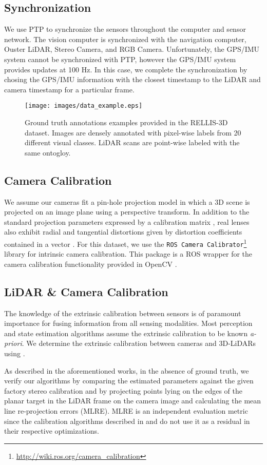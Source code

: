 \documentclass[letterpaper, 10 pt, conference]{ieeeconf}
\begin{document}
\subsection{Synchronization}
We use PTP to synchronize the sensors throughout the computer and sensor network. The vision computer is synchronized with the navigation computer, Ouster LiDAR, Stereo Camera, and RGB Camera. Unfortunately, the GPS/IMU system cannot be synchronized with PTP, however the GPS/IMU system provides updates at 100 Hz. In this case, we complete the synchronization by chosing the GPS/IMU information with the closest timestamp to the LiDAR and camera timestamp for a particular frame.
\begin{figure*}
\vspace{5pt}
  \centering
  \texttt{[image: images/data\_example.eps]}
  \caption{Ground truth annotations examples provided in the RELLIS-3D dataset. Images are densely annotated with pixel-wise labels from 20 different visual classes. LiDAR scans are point-wise labeled with the same ontogloy.}
  \label{fig:data_exp}
\end{figure*} \subsection{Camera Calibration}
We assume our cameras fit a pin-hole projection model in which a 3D scene is projected on an image plane using a perspective transform. In addition to the standard projection parameters expressed by a calibration matrix , real lenses also exhibit radial and tangential distortions given by distortion coefficients contained in a vector . For this dataset, we use the \texttt{ROS Camera Calibrator}\footnote{\url{http://wiki.ros.org/camera_calibration}} library for intrinsic camera calibration. This package is a ROS wrapper for the camera calibration functionality provided in OpenCV \cite{opencvlibrary}. 

\subsection{LiDAR \& Camera Calibration}
The knowledge of the extrinsic calibration between sensors is of paramount importance for fusing information from all sensing modalities. Most perception and state estimation algorithms assume the extrinsic calibration to be known \emph{a-priori}. We determine the extrinsic calibration between cameras and 3D-LiDARs using \cite{PBPC,mishra2020experimental,osteen_2105}.

As described in the aforementioned works, in the absence of ground truth, we verify our algorithms by comparing the estimated parameters against the given factory stereo calibration and by projecting points lying on the edges of the planar target in the LiDAR frame on the camera image and calculating the mean line re-projection errors (MLRE). MLRE is an independent evaluation metric since the calibration algorithms described in \cite{PBPC} and \cite{mishra2020experimental} do not use it as a residual in their respective optimizations.
 
\end{document}
